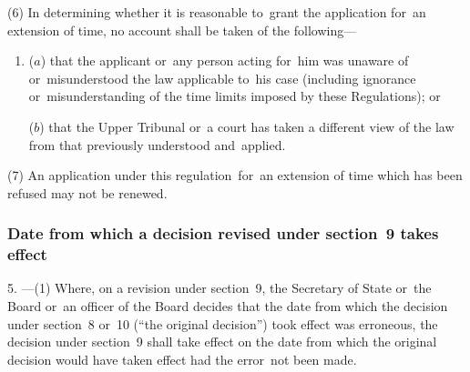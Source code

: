 \documentclass[12pt,a4paper]{article}
\begin{document}
(6) In determining whether it is reasonable to~grant the application for~an extension of time, no account shall be taken of the following—
\begin{enumerate}\item[]
($a$) that the applicant or~any person acting for~him was unaware of or~misunderstood the law applicable to~his case (including ignorance or~misunderstanding of the time limits imposed by these Regulations); or

($b$) that 
the Upper Tribunal  %
or~a court has taken a different view of the law from that previously understood and~applied.
\end{enumerate}

(7) An application under this regulation~for~an extension of time which has been refused may not be renewed.


\subsubsection[5. Date from which a decision revised under section~9 takes effect]{Date from which a decision revised under section~9 takes effect}

5.%
---(1)  %
  Where, on a revision under section~9, the Secretary of State
or~the Board or~an officer of the Board  %
decides that the date from which the decision under section~8 or~10 (“the original decision”) took effect was erroneous, the decision under section~9 shall take effect on the date from which the original decision would have taken effect had the error~not been made.
\end{document}
